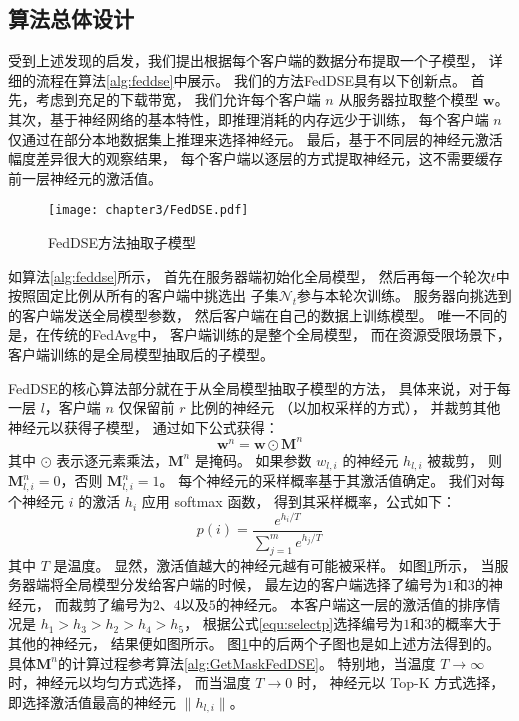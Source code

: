 \subsection{算法总体设计}
受到上述发现的启发，我们提出根据每个客户端的数据分布提取一个子模型，
详细的流程在算法\ref{alg:feddse}中展示。
我们的方法FedDSE具有以下创新点。
首先，考虑到充足的下载带宽，
我们允许每个客户端 $n$ 从服务器拉取整个模型 $\mathbf{w}$。
其次，基于神经网络的基本特性，即推理消耗的内存远少于训练，
每个客户端 $n$ 仅通过在部分本地数据集上推理来选择神经元。
最后，基于不同层的神经元激活幅度差异很大的观察结果，
每个客户端以逐层的方式提取神经元，这不需要缓存前一层神经元的激活值。
\begin{figure}[thbp]
    \centering
    \texttt{[image: chapter3/FedDSE.pdf]}
    \caption{\label{fig:3-3-feddse}FedDSE方法抽取子模型}
\end{figure}
如算法\ref{alg:feddse}所示，
首先在服务器端初始化全局模型，
然后再每一个轮次$t$中按照固定比例从所有的客户端中挑选出
子集$\mathcal{N}_t$参与本轮次训练。
服务器向挑选到的客户端发送全局模型参数，
然后客户端在自己的数据上训练模型。
唯一不同的是，在传统的FedAvg中，
客户端训练的是整个全局模型，
而在资源受限场景下，客户端训练的是全局模型抽取后的子模型。

FedDSE的核心算法部分就在于从全局模型抽取子模型的方法，
具体来说，对于每一层 $l$，客户端 $n$ 仅保留前 $r$ 比例的神经元
（以加权采样的方式），
并裁剪其他神经元以获得子模型，
通过如下公式获得：
\begin{equation}
    \mathbf{w}^n = \mathbf{w} \odot \mathbf{M}^n
\end{equation}
其中 $\odot$ 表示逐元素乘法，$\mathbf{M}^n$ 是掩码。
如果参数 $w_{l,i}$ 的神经元 $h_{l,i}$ 被裁剪，
则 $\mathbf{M}^n_{l,i}=0$，否则 $\mathbf{M}^n_{l,i}=1$。
每个神经元的采样概率基于其激活值确定。
我们对每个神经元 $i$ 的激活 $h_i$ 应用 softmax 函数，
得到其采样概率，公式如下：
\begin{equation}
    \label{equ:selectp}
    p(i)=\frac{e^{h_i/T}}{\sum_{j=1}^me^{h_j/T}}
\end{equation}
其中 $T$ 是温度。
显然，激活值越大的神经元越有可能被采样。
如图\ref{fig:3-3-feddse}所示，
当服务器端将全局模型分发给客户端的时候，
最左边的客户端选择了编号为$1$和$3$的神经元，
而裁剪了编号为$2$、$4$以及$5$的神经元。
本客户端这一层的激活值的排序情况是
$h_1 > h_3 > h_2 > h_4 > h_5$，
根据公式\ref{equ:selectp}选择编号为$1$和$3$的概率大于
其他的神经元，
结果便如图所示。
图\ref{fig:3-3-feddse}中的后两个子图也是如上述方法得到的。
具体$\mathbf{M}^n$的计算过程参考算法\ref{alg:GetMaskFedDSE}。
特别地，当温度 $T\rightarrow \infty$ 时，神经元以均匀方式选择，
而当温度 $T\rightarrow 0$ 时，
神经元以 Top-K 方式选择，即选择激活值最高的神经元 $\|h_{l,i}\|$。

